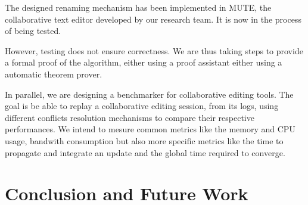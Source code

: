 \documentclass[sigplan]{acmart}
\begin{document}
The designed renaming mechanism has been implemented in MUTE, the collaborative text editor developed by our research team.
It is now in the process of being tested.

However, testing does not ensure correctness.
We are thus taking steps to provide a formal proof of the algorithm, either using a proof assistant either using a automatic theorem prover.


In parallel, we are designing a benchmarker for collaborative editing tools.
The goal is be able to replay a collaborative editing session, from its logs, using different conflicts resolution mechanisms to compare their respective performances.
We intend to mesure common metrics like the memory and CPU usage, bandwith consumption but also more specific metrics like the time to propagate and integrate an update and the global time required to converge.

\section{Conclusion and Future Work}





 

\end{document}
